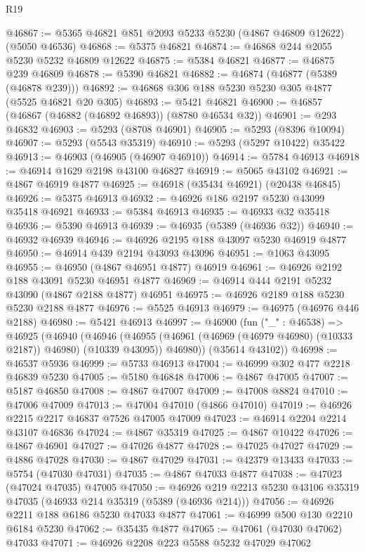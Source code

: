 \begin{lexlean}{R19}
\begin{coremodule}
@46867 := @5365 @46821 @851 @2093 @5233 @5230 (@4867 @46809 @12622) (@5050 @46536)
@46868 := @5375 @46821
@46874 := @46868 @244 @2055 @5230 @5232 @46809 @12622
@46875 := @5384 @46821
@46877 := @46875 @239 @46809
@46878 := @5390 @46821
@46882 := @46874 (@46877 (@5389 (@46878 @239)))
@46892 := @46868 @306 @188 @5230 @5230 @305 @4877 (@5525 @46821 @20 @305)
@46893 := @5421 @46821
@46900 := @46857 (@46867 (@46882 (@46892 @46893)) (@8780 @46534 @32))
@46901 := @293 @46832
@46903 := @5293 (@8708 @46901)
@46905 := @5293 (@8396 @10094)
@46907 := @5293 (@5543 @35319)
@46910 := @5293 (@5297 @10422) @35422
@46913 := @46903 (@46905 (@46907 @46910))
@46914 := @5784 @46913
@46918 := @46914 @1629 @2198 @43100 @46827
@46919 := @5065 @43102
@46921 := @4867 @46919 @4877
@46925 := @46918 (@35434 @46921) (@20438 @46845)
@46926 := @5375 @46913
@46932 := @46926 @186 @2197 @5230 @43099 @35418 @46921
@46933 := @5384 @46913
@46935 := @46933 @32 @35418
@46936 := @5390 @46913
@46939 := @46935 (@5389 (@46936 @32))
@46940 := @46932 @46939
@46946 := @46926 @2195 @188 @43097 @5230 @46919 @4877
@46950 := @46914 @439 @2194 @43093 @43096
@46951 := @1063 @43095
@46955 := @46950 (@4867 @46951 @4877) @46919
@46961 := @46926 @2192 @188 @43091 @5230 @46951 @4877
@46969 := @46914 @444 @2191 @5232 @43090 (@4867 @2188 @4877) @46951
@46975 := @46926 @2189 @188 @5230 @5230 @2188 @4877
@46976 := @5525 @46913
@46979 := @46975 (@46976 @446 @2188)
@46980 := @5421 @46913
@46997 := @46900
    (fun ("_" : @46538) =>
    @46925
      (@46940
        (@46946
          (@46955 (@46961 (@46969 (@46979 @46980) (@10333 @2187)) @46980) (@10339 @43095))
          @46980))
      (@35614 @43102))
@46998 := @46537 @5936
@46999 := @5733 @46913
@47004 := @46999 @302 @477 @2218 @46839 @5230
@47005 := @5180 @46848
@47006 := @4867 @47005
@47007 := @5187 @46850
@47008 := @4867 @47007
@47009 := @47008 @8824
@47010 := @47006 @47009
@47013 := @47004 @47010 (@4866 @47010)
@47019 := @46926 @2215 @2217 @46837 @7526 @47005 @47009
@47023 := @46914 @2204 @2214 @43107 @46836
@47024 := @4867 @35319
@47025 := @4867 @10422
@47026 := @4867 @46901
@47027 := @47026 @4877
@47028 := @47025 @47027
@47029 := @4886 @47028
@47030 := @4867 @47029
@47031 := @42379 @13433
@47033 := @5754 (@47030 @47031)
@47035 := @4867 @47033 @4877
@47038 := @47023 (@47024 @47035) @47005
@47050 := @46926 @219 @2213 @5230 @43106 @35319 @47035 (@46933 @214 @35319 (@5389 (@46936 @214)))
@47056 := @46926 @2211 @188 @6186 @5230 @47033 @4877
@47061 := @46999 @500 @130 @2210 @6184 @5230
@47062 := @35435 @4877
@47065 := @47061 (@47030 @47062) @47033
@47071 := @46926 @2208 @223 @5588 @5232 @47029 @47062

\end{coremodule}
\end{lexlean}
